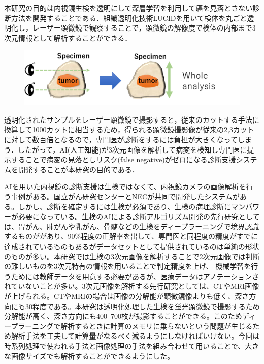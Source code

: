 本研究の目的は内視鏡生検を透明にして深層学習を利用して癌を見落とさない診断方法を開発することである．組織透明化技術LUCIDを用いて検体を丸ごと透明化し，レーザー顕微鏡で観察することで，顕微鏡の解像度で検体の内部まで3次元情報として解析することができる．

\begin{figure}
	\centering
	\includegraphics[width=0.7\linewidth]{fig/chapter1/whole_image_analysis}
	\caption[whole image analysis]{}
	\label{fig:wholeimageanalysis}
\end{figure}


透明化されたサンプルをレーザー顕微鏡で撮影すると，従来のカットする手法に換算して1000カットに相当するため，得られる顕微鏡撮影像が従来の2,3カットに対して数百倍となるので，専門医が診断をするには負担が大きくなってしまう．したがって，AI(人工知能)が3次元画像を解析して病変を検知し専門医に提示することで病変の見落としリスク(false negative)がゼロになる診断支援システムを開発することが本研究の目的である．

AIを用いた内視鏡の診断支援は生検ではなくて、内視鏡カメラの画像解析を行う事例がある。国立がん研究センターとNECが共同で開発したシステムがある。しかし、診断を確定するには生検が必須であり、生検の病理診断にマンパワーが必要になっている。生検のAIによる診断アルゴリズム開発の先行研究としては、胃がん、肺がんや乳がん、骨髄などの生検をディープラーニングで境界認識するものががあり、90\%程度の正解率を出して、専門医と同程度の精度がすでに達成されているものもあるがデータセットとして提供されているのは単純の形状のものが多い。本研究では生検の3次元画像を解析することで2次元画像では判断の難しいものを3次元特有の情報を用いることで判定精度を上げ、
機械学習を行うためには教師データを用意する必要があるが、医療データはアノテーションされていないことが多い。3次元画像を解析する先行研究としては、CTやMRI画像が上げられる。CTやMRIの場合は画像の分解能が顕微鏡像よりも低く、深さ方向にも30程度である。本研究は透明化処理した生検を蛍光顕微鏡で撮影するため分解能が高く、深さ方向にも400~700枚が撮影することができる。このためディープラーニングで解析するときに計算のメモリに乗らないという問題が生じるため解析手法を工夫して計算量がなるべく減るようにしなければいけない。今回は時系列処理で使われる手法と画像処理の手法を組み合わせて用いることで、大きな画像サイズでも解析することができるようにした。


